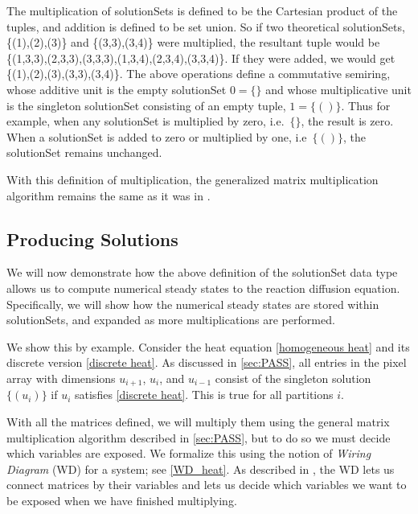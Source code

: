 \documentclass[11pt]{article}
\begin{document}
The multiplication of solutionSets is defined to be the Cartesian product of the tuples, and addition is defined to be set union. So if two theoretical solutionSets, \{(1),(2),(3)\} and \{(3,3),(3,4)\} were multiplied, the resultant tuple would be \{(1,3,3),(2,3,3),(3,3,3),(1,3,4),(2,3,4),(3,3,4)\}. If they were added, we would get \{(1),(2),(3),(3,3),(3,4)\}. The above operations define a commutative semiring, whose additive unit is the empty solutionSet $0=\{\}$ and whose multiplicative unit is the singleton solutionSet consisting of an empty tuple, $1=\{()\}$. Thus for example, when any solutionSet is multiplied by zero, i.e.\ $\{\}$, the result is zero. When a solutionSet is added to zero or multiplied by one, i.e\ $\{()\}$, the solutionSet remains unchanged.

With this definition of multiplication, the generalized matrix multiplication algorithm remains the same as it was in \citep{Introduction_to_PA}.

\subsection{Producing Solutions}

We will now demonstrate how the above definition of the solutionSet data type allows us to compute numerical steady states to the reaction diffusion equation. Specifically, we will show how the numerical steady states are stored within solutionSets, and expanded as more multiplications are performed. 

We show this by example. Consider the heat equation \eqref{homogeneous heat} and its discrete version \eqref{discrete heat}. As discussed in \cref{sec:PASS}, all entries in the pixel array with dimensions $u_{i+1}$, $u_i$, and $u_{i-1}$ consist of the singleton solution $\{(u_i)\}$ if $u_i$ satisfies \cref{discrete heat}. This is true for all partitions $i$.

With all the matrices defined, we will multiply them using the general matrix multiplication algorithm described in \cref{sec:PASS}, but to do so we must decide which variables are exposed. We formalize this using the notion of \textit{Wiring Diagram} (WD) for a system; see \cref{WD_heat}. As described in \citep{Introduction_to_PA}, the WD lets us connect matrices by their variables and lets us decide which variables we want to be exposed when we have finished multiplying.
\end{document}
